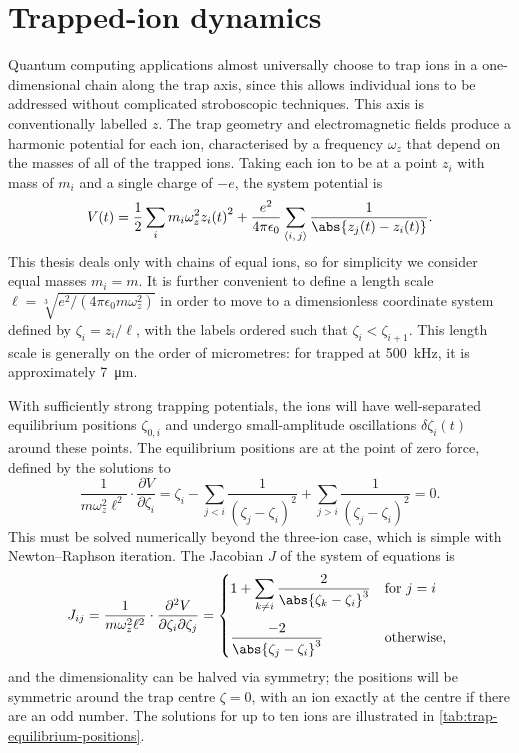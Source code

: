 \section{Trapped-ion dynamics}
\label{sec:iontrap-dynamics}

Quantum computing applications almost universally choose to trap ions in a one-dimensional chain along the trap axis, since this allows individual ions to be addressed without complicated stroboscopic techniques.
This axis is conventionally labelled $z$.
The trap geometry and electromagnetic fields produce a harmonic potential for each ion, characterised by a frequency $\omega_z$ that depend on the masses of all of the trapped ions.
Taking each ion to be at a point $z_i$ with mass of $m_i$ and a single charge of $-e$, the system potential is
\begin{equation}\label{eq:iontrap-potential}
V(t) = \frac12 \sum_i m_i \omega_z^2 {z_i(t)}^2 + \frac{e^2}{4\pi\epsilon_0}\sum_{\langle i,\,j\rangle}\frac1{\abs{z_j(t) - z_i(t)}}.
\end{equation}
This thesis deals only with chains of equal ions, so for simplicity we consider equal masses $m_i = m$.
It is further convenient to define a length scale $\ell = \sqrt[3]{e^2/(4\pi\epsilon_0 m \omega_z^2)}$ in order to move to a dimensionless coordinate system defined by $\zeta_i = z_i / \ell$, with the labels ordered such that $\zeta_i < \zeta_{i+1}$.
This length scale is generally on the order of micrometres: for  trapped at \qty{500}{\kilo\Hz}, it is approximately \qty{7}{\micro\m}.

With sufficiently strong trapping potentials, the ions will have well-separated equilibrium positions $\zeta_{0,i}$ and undergo small-amplitude oscillations $\delta\zeta_i(t)$ around these points.
The equilibrium positions are at the point of zero force, defined by the solutions to
\begin{equation}\label{eq:trap-equilibrium-positions}
\frac1{m\omega_z^2\ell^2}\cdot\frac{\partial V}{\partial \zeta_i}
    = \zeta_i - \sum_{j<i}\frac1{{(\zeta_j-\zeta_i)}^2} + \sum_{j>i}\frac1{{(\zeta_j-\zeta_i)}^2}
    = 0.
\end{equation}
This must be solved numerically beyond the three-ion case, which is simple with Newton--Raphson iteration.
The Jacobian $J$ of the system of equations is
\begin{equation}
J_{ij} = \frac1{m\omega_z^2\ell^2}\cdot\frac{\partial^2V}{\partial\zeta_i\partial\zeta_j} = \begin{dcases*}
    1 + \sum_{k\neq i}\frac2{{\abs{\zeta_k - \zeta_i}}^3} & for $j = i$\\[0.4em]
    \frac{-2}{{\abs{\zeta_j - \zeta_i}}^3} & otherwise,
\end{dcases*}
\end{equation}
and the dimensionality can be halved via symmetry; the positions will be symmetric around the trap centre $\zeta=0$, with an ion exactly at the centre if there are an odd number.
The solutions for up to ten ions are illustrated in \cref{tab:trap-equilibrium-positions}.


